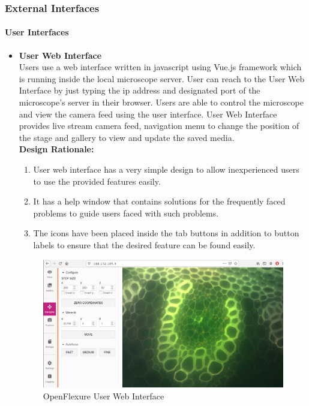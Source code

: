 \subsubsection{External Interfaces}
	\paragraph{User Interfaces}
	\begin{itemize}
		\item \textbf{User Web Interface} \\
		Users use a web interface written in javascript using Vue.js framework which is running inside the local microscope server. User can reach to  the User Web Interface by just typing the ip address and designated port of the microscope's server in their browser. Users are able to control the microscope and view the camera feed using the user interface. User Web Interface provides live stream camera feed, navigation menu to change the position of the stage and gallery to view and update the saved media. \\
		\textbf{Design Rationale:} 
		\begin{enumerate}
			\item User web interface has a very simple design to allow inexperienced users to use the provided features easily.
			\item It has a help window that contains solutions for the frequently faced problems to guide users faced with such problems.
			\item The icons have been placed inside the tab buttons in addition to button labels to ensure that the desired feature can be found easily.
		\end{enumerate}
		\begin{figure}[H]
			\centering
			\includegraphics[scale=0.3]{Figures/user_web_interface}
			\caption{OpenFlexure User Web Interface}

\end{figure}
\end{itemize}
